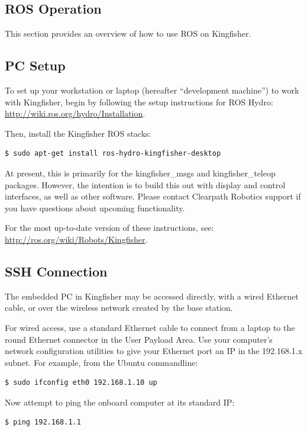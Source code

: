 \documentclass[]{clearpath-latex/clearpath-manual}
\begin{document}
\begin{enumerate}[nolistsep]
\begin{enumerate}[nolistsep]
\section{ROS Operation}
This section provides an overview of how to use ROS on Kingfisher.

\subsection{PC Setup}

To set up your workstation or laptop (hereafter “development machine”) to work with Kingfisher, begin by following the setup instructions for ROS Hydro: \url{http://wiki.ros.org/hydro/Installation}.

Then, install the Kingfisher ROS stacks:

\begin{lstlisting} 
$ sudo apt-get install ros-hydro-kingfisher-desktop
\end{lstlisting}

At present, this is primarily for the kingfisher_msgs and kingfisher_teleop packages. However, the intention is to build this out with display and control interfaces, as well as other software. Please contact Clearpath Robotics support if you have questions about upcoming functionality.

For the most up-to-date version of these instructions, see: \url{http://ros.org/wiki/Robots/Kingfisher}.

\subsection{SSH Connection}
The embedded PC in Kingfisher may be accessed directly, with a wired Ethernet cable, or over the wireless network created by the base station.

For wired access, use a standard Ethernet cable to connect from a laptop to the round Ethernet connector in the User Payload Area. Use your computer’s network configuration utilities to give your Ethernet port an IP in the 192.168.1.x subnet. For example, from the Ubuntu commandline:

\begin{lstlisting}
$ sudo ifconfig eth0 192.168.1.10 up
\end{lstlisting}

Now attempt to ping the onboard computer at its standard IP:

\begin{lstlisting}
$ ping 192.168.1.1
\end{lstlisting}


\end{enumerate}
\end{enumerate}
\end{document}
